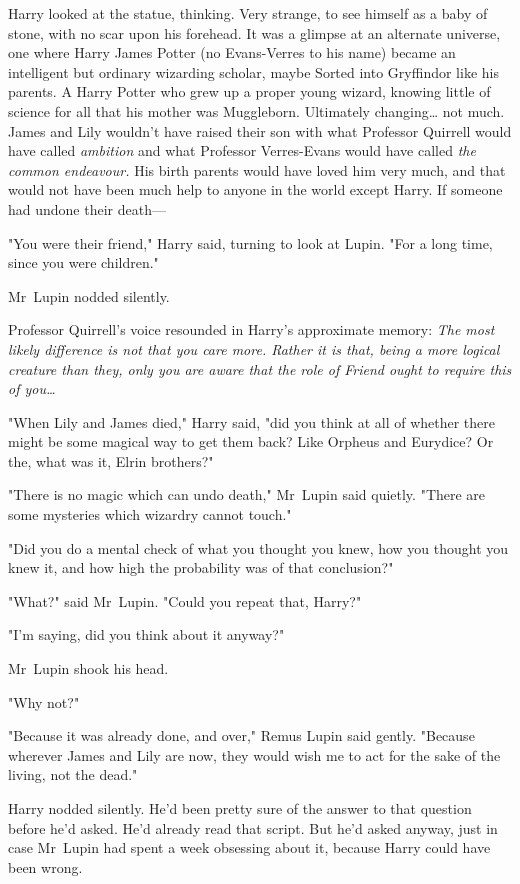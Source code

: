 Harry looked at the statue, thinking. Very strange, to see himself as a baby of
stone, with no scar upon his forehead. It was a glimpse at an alternate
universe, one where Harry James Potter (no Evans-Verres to his name) became an
intelligent but ordinary wizarding scholar, maybe Sorted into Gryffindor like
his parents. A Harry Potter who grew up a proper young wizard, knowing little
of science for all that his mother was Muggleborn. Ultimately changing{\ldots}
not much. James and Lily wouldn't have raised their son with what Professor
Quirrell would have called \emph{ambition} and what Professor Verres-Evans
would have called \emph{the common endeavour.} His birth parents would have
loved him very much, and that would not have been much help to anyone in the
world except Harry. If someone had undone their death---

"You were their friend," Harry said, turning to look at Lupin. "For a long
time, since you were children."

Mr~Lupin nodded silently.

Professor Quirrell's voice resounded in Harry's approximate memory: \emph{The
most likely difference is not that you care more. Rather it is that, being a
more logical creature than they, only you are aware that the role of Friend
ought to require this of you{\ldots}}

"When Lily and James died," Harry said, "did you think at all of whether there
might be some magical way to get them back? Like Orpheus and Eurydice? Or the,
what was it, Elrin brothers?"

"There is no magic which can undo death," Mr~Lupin said quietly. "There are
some mysteries which wizardry cannot touch."

"Did you do a mental check of what you thought you knew, how you thought you
knew it, and how high the probability was of that conclusion?"

"What?" said Mr~Lupin. "Could you repeat that, Harry?"

"I'm saying, did you think about it anyway?"

Mr~Lupin shook his head.

"Why not?"

"Because it was already done, and over," Remus Lupin said gently. "Because
wherever James and Lily are now, they would wish me to act for the sake of the
living, not the dead."

Harry nodded silently. He'd been pretty sure of the answer to that question
before he'd asked. He'd already read that script. But he'd asked anyway, just
in case Mr~Lupin had spent a week obsessing about it, because Harry could have
been wrong.

